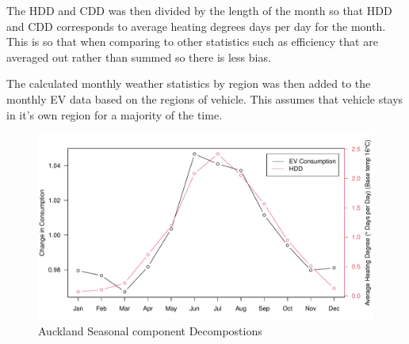 \documentclass[
]{article}
\begin{document}
The HDD and CDD was then divided by the length of the month so that HDD
and CDD corresponds to average heating degrees days per day for the
month. This is so that when comparing to other statistics such as
efficiency that are averaged out rather than summed so there is less
bias.

The calculated monthly weather statistics by region was then added to
the monthly EV data based on the regions of vehicle. This assumes that
vehicle stays in it's own region for a majority of the time.

\begin{figure}
\centering
\includegraphics{final_report_files/figure-latex/eff_HDD_plot-1.pdf}
\caption{Auckland Seasonal component
Decompostions\label{fig:eff_HDD_plot}}
\end{figure}
\end{document}
